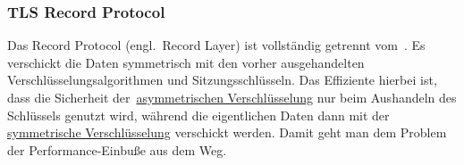 	\subsubsection{TLS Record Protocol}\label{subsubsec:tlsRecord}
		Das Record Protocol (engl.\ Record Layer) ist vollständig getrennt vom~.
		Es verschickt die Daten symmetrisch mit den vorher ausgehandelten Verschlüsselungsalgorithmen und Sitzungsschlüsseln.
		Das Effiziente hierbei ist,
		dass die Sicherheit der~\hyperref[subsubsec:asymVersch]{asymmetrischen Verschlüsselung}
		nur beim Aushandeln des Schlüssels genutzt wird,
		während die eigentlichen Daten dann mit der
		\hyperref[subsubsec:symVersch]{symmetrische Verschlüsselung} verschickt werden.
		Damit geht man dem Problem der Performance-Einbuße aus dem Weg.